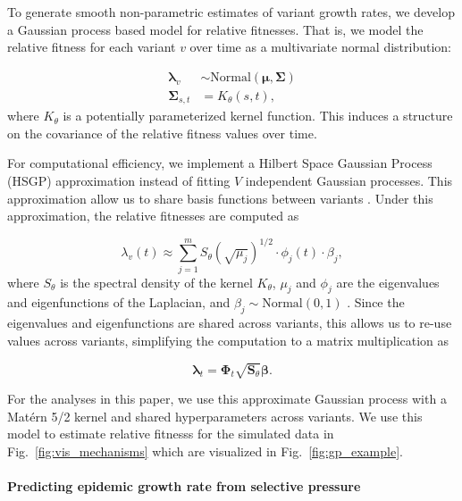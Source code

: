 \documentclass[12pt,oneside,letterpaper]{article}
\renewcommand{\vec}[1]{\boldsymbol{#1}}
\begin{document}
To generate smooth non-parametric estimates of variant growth rates, we develop a Gaussian process based model for relative fitnesses.
That is, we model the relative fitness for each variant $v$ over time as a multivariate normal distribution:

\begin{align*}
    \vec{\lambda}_{v} &\sim \text{Normal}(\vec{\mu}, \vec{\Sigma})\\
    \vec{\Sigma}_{s, t} &= K_{\theta}(s, t),
\end{align*}
where $K_{\theta}$ is a potentially parameterized kernel function.
This induces a structure on the covariance of the relative fitness values over time.


For computational efficiency, we implement a Hilbert Space Gaussian Process (HSGP) approximation instead of fitting $V$ independent Gaussian processes.
This approximation allow us to share basis functions between variants \cite{riutortmayol2022practical}.
Under this approximation, the relative fitnesses are computed as

\begin{equation}
    \lambda_{v}(t) \approx \sum_{j=1}^{m} S_{\theta}(\sqrt{\mu_{j}})^{1/2} \cdot \phi_{j}(t) \cdot \beta_{j},
\end{equation}
where $S_{\theta}$ is the spectral density of the kernel $K_\theta$, $\mu_{j}$ and $\phi_{j}$ are the eigenvalues and eigenfunctions of the Laplacian, and $\beta_{j} \sim \text{Normal}(0,1)$ \cite{riutortmayol2022practical}.
Since the eigenvalues and eigenfunctions are shared across variants, this allows us to re-use values across variants, simplifying the computation to a matrix multiplication as

\begin{equation*}
    \vec{\lambda}_{t} = \vec{\Phi}_{t} \sqrt{\vec{S}_{\theta}}\vec{\beta}.
\end{equation*}


For the analyses in this paper, we use this approximate Gaussian process with a Mat\'ern 5/2 kernel and shared hyperparameters across variants.
We use this model to estimate relative fitnesss for the simulated data in Fig.~\ref{fig:vis_mechanisms} which are visualized in Fig.~\ref{fig:gp_example}.

\paragraph{Predicting epidemic growth rate from selective pressure}%
\end{document}
